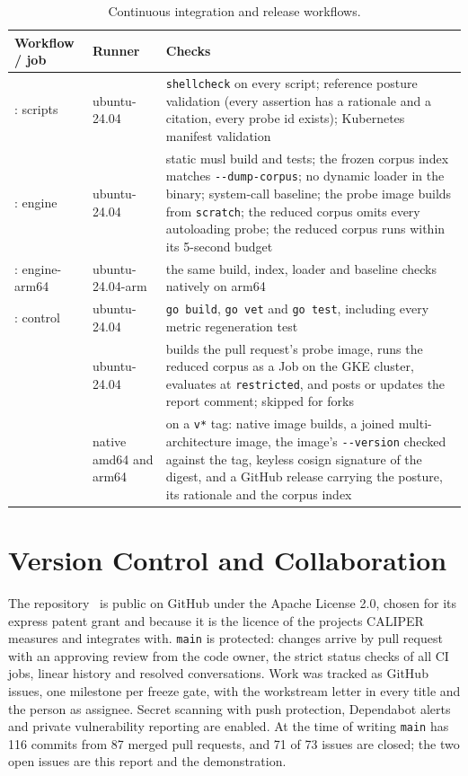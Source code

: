 \begin{table}[htbp]
\centering\small
\begin{tabularx}{\textwidth}{@{}P{3.0cm}P{2.6cm}L@{}}
\toprule
\textbf{Workflow / job} & \textbf{Runner} & \textbf{Checks} \\
\midrule
{}: scripts & ubuntu-24.04 & \texttt{shellcheck} on every script; reference posture validation (every assertion has a rationale and a citation, every probe id exists); Kubernetes manifest validation \\
: engine & ubuntu-24.04 & static musl build and tests; the frozen corpus index matches \texttt{-{}-dump-corpus}; no dynamic loader in the binary; system-call baseline; the probe image builds from \texttt{scratch}; the reduced corpus omits every autoloading probe; the reduced corpus runs within its 5-second budget \\
: engine-arm64 & ubuntu-24.04-arm & the same build, index, loader and baseline checks natively on arm64 \\
: control & ubuntu-24.04 & \texttt{go build}, \texttt{go vet} and \texttt{go test}, including every metric regeneration test \\
 & ubuntu-24.04 & builds the pull request's probe image, runs the reduced corpus as a Job on the GKE cluster, evaluates at \texttt{restricted}, and posts or updates the report comment; skipped for forks \\
 & native amd64 and arm64 & on a \texttt{v*} tag: native image builds, a joined multi-architecture image, the image's \texttt{-{}-version} checked against the tag, keyless cosign signature of the digest, and a GitHub release carrying the posture, its rationale and the corpus index \\
\bottomrule
\end{tabularx}
\caption{Continuous integration and release workflows.}
\label{tab:ci}
\end{table}

\section{Version Control and Collaboration}

The repository~\cite{caliper} is public on GitHub under the Apache License 2.0, chosen for its express patent grant and because it is the licence of the projects CALIPER measures and integrates with. \texttt{main} is protected: changes arrive by pull request with an approving review from the code owner, the strict status checks of all CI jobs, linear history and resolved conversations. Work was tracked as GitHub issues, one milestone per freeze gate, with the workstream letter in every title and the person as assignee. Secret scanning with push protection, Dependabot alerts and private vulnerability reporting are enabled. At the time of writing \texttt{main} has 116 commits from 87 merged pull requests, and 71 of 73 issues are closed; the two open issues are this report and the demonstration.

